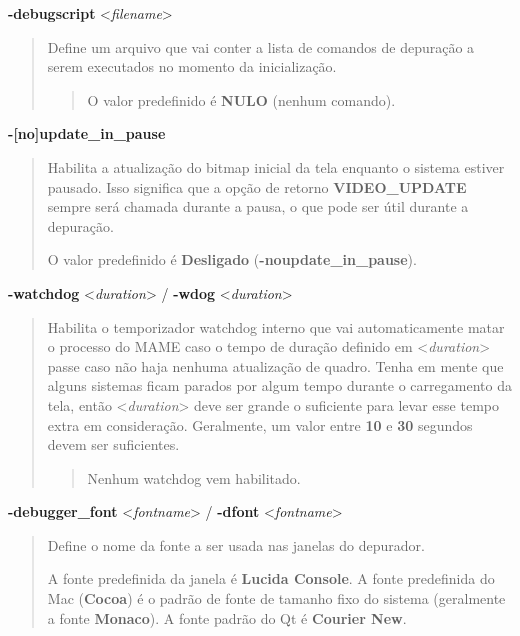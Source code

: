 \documentclass[letterpaper,10pt,brazil]{sphinxmanual}
\begin{document}
\label{commandline/commandline-all:mame-commandline-debugscript}
\textbf{-debugscript} \textless{}\emph{filename}\textgreater{}
\begin{quote}

Define um arquivo que vai conter a lista de comandos de depuração a
serem executados no momento da inicialização.
\begin{quote}

O valor predefinido é \textbf{NULO} (nenhum comando).
\end{quote}
\end{quote}
\label{commandline/commandline-all:mame-commandline-updateinpause}
\textbf{-{[}no{]}update\_in\_pause}
\begin{quote}

Habilita a atualização do bitmap inicial da tela enquanto o sistema
estiver pausado. Isso significa que a opção de retorno
\textbf{VIDEO\_UPDATE} sempre será chamada durante a pausa, o que pode ser
útil durante a depuração.

O valor predefinido é \textbf{Desligado} (\textbf{-noupdate\_in\_pause}).
\end{quote}
\label{commandline/commandline-all:mame-commandline-watchdog}
\textbf{-watchdog} \textless{}\emph{duration}\textgreater{} / \textbf{-wdog} \textless{}\emph{duration}\textgreater{}
\begin{quote}

Habilita o temporizador watchdog interno que vai automaticamente
matar o processo do MAME caso o tempo de duração definido em
\textless{}\emph{duration}\textgreater{} passe caso não haja nenhuma atualização de quadro.
Tenha em mente que alguns sistemas ficam parados por algum tempo
durante o carregamento da tela, então \textless{}\emph{duration}\textgreater{} deve ser grande
o suficiente para levar esse tempo extra em consideração.
Geralmente, um valor entre \textbf{10} e \textbf{30} segundos devem ser
suficientes.
\begin{quote}

Nenhum watchdog vem habilitado.
\end{quote}
\end{quote}
\label{commandline/commandline-all:mame-commandline-debuggerfont}
\textbf{-debugger\_font} \textless{}\emph{fontname}\textgreater{} / \textbf{-dfont} \textless{}\emph{fontname}\textgreater{}
\begin{quote}

Define o nome da fonte a ser usada nas janelas do depurador.

A fonte predefinida da janela é \textbf{Lucida Console}.
A fonte predefinida do Mac (\textbf{Cocoa}) é o padrão de fonte de
tamanho fixo do sistema (geralmente a fonte \textbf{Monaco}).
A fonte padrão do Qt é \textbf{Courier New}.
\end{quote}
\end{document}
